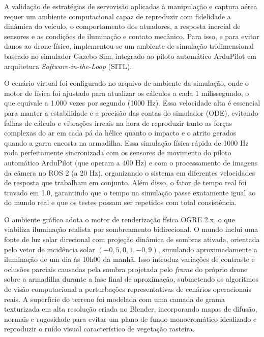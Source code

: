 
A validação de estratégias de servovisão aplicadas à manipulação e captura aérea requer um ambiente computacional capaz de reproduzir com fidelidade a dinâmica do veículo, o comportamento dos atuadores, a resposta inercial de sensores e as condições de iluminação e contato mecânico. Para isso, e para evitar danos ao drone físico, implementou-se um ambiente de simulação tridimensional baseado no simulador Gazebo Sim, integrado ao piloto automático ArduPilot em arquitetura \textit{Software-in-the-Loop} (SITL).

O cenário virtual foi configurado no arquivo de ambiente da simulação, onde o motor de física foi ajustado para atualizar os cálculos a cada 1 milissegundo, o que equivale a 1.000 vezes por segundo (1000 Hz). Essa velocidade alta é essencial para manter a estabilidade e a precisão das contas do simulador (ODE), evitando falhas de cálculo e vibrações irreais na hora de reproduzir tanto as forças complexas do ar em cada pá da hélice quanto o impacto e o atrito gerados quando a garra encosta na armadilha. Essa simulação física rápida de 1000 Hz roda perfeitamente sincronizada com os sensores de movimento do piloto automático ArduPilot (que operam a 400 Hz) e com o processamento de imagens da câmera no ROS 2 (a 20 Hz), organizando o sistema em diferentes velocidades de resposta que trabalham em conjunto. Além disso, o fator de tempo real foi travado em 1,0, garantindo que o tempo na simulação passe exatamente igual ao do mundo real e que os testes possam ser repetidos com total consistência.

O ambiente gráfico adota o motor de renderização física OGRE 2.x, o que viabiliza iluminação realista por sombreamento bidirecional. O mundo inclui uma fonte de luz solar direcional com projeção dinâmica de sombras ativada, orientada pelo vetor de incidência solar $(-0{,}5, 0{,}1, -0{,}9)$, simulando aproximadamente a iluminação de um dia às 10h00 da manhã. Isso introduz variações de contraste e oclusões parciais causadas pela sombra projetada pelo \textit{frame} do próprio drone sobre a armadilha durante a fase final de aproximação, submetendo os algoritmos de visão computacional a perturbações representativas de cenários operacionais reais. A superfície do terreno foi modelada com uma camada de grama texturizada em alta resolução criada no Blender, incorporando mapas de difusão, normais e rugosidade para evitar um plano de fundo monocromático idealizado e reproduzir o ruído visual característico de vegetação rasteira.

